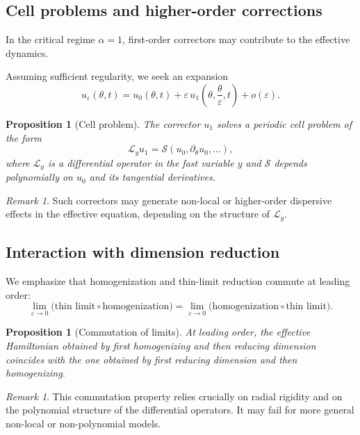 \documentclass[11pt]{amsart}
\theoremstyle{plain}
\newtheorem{proposition}[theorem]{Proposition}
\theoremstyle{definition}
\theoremstyle{remark}
\newtheorem{remark}[theorem]{Remark}
\theoremstyle{remark}
\begin{document}
\subsection{Cell problems and higher-order corrections}

In the critical regime $\alpha=1$, first-order correctors may contribute to the
effective dynamics.

Assuming sufficient regularity, we seek an expansion
\[
u_\varepsilon(\theta,t)
=
u_0(\theta,t)
+
\varepsilon\,u_1\!\left(\theta,\frac{\theta}{\varepsilon},t\right)
+ o(\varepsilon).
\]

\begin{proposition}[Cell problem]
\label{prop:cell-problem}
The corrector $u_1$ solves a periodic cell problem of the form
\[
\mathcal L_y u_1
=
\mathcal S(u_0,\partial_\theta u_0,\ldots),
\]
where $\mathcal L_y$ is a differential operator in the fast variable $y$ and
$\mathcal S$ depends polynomially on $u_0$ and its tangential derivatives.
\end{proposition}

\begin{remark}
Such correctors may generate non-local or higher-order dispersive effects in the
effective equation, depending on the structure of $\mathcal L_y$.
\end{remark}

\subsection{Interaction with dimension reduction}

We emphasize that homogenization and thin-limit reduction commute at leading
order:
\[
\lim_{\varepsilon\to0}
\bigl(\text{thin limit} \circ \text{homogenization}\bigr)
=
\lim_{\varepsilon\to0}
\bigl(\text{homogenization} \circ \text{thin limit}\bigr).
\]

\begin{proposition}[Commutation of limits]
At leading order, the effective Hamiltonian obtained by first homogenizing and
then reducing dimension coincides with the one obtained by first reducing
dimension and then homogenizing.
\end{proposition}

\begin{remark}
This commutation property relies crucially on radial rigidity and on the
polynomial structure of the differential operators.
It may fail for more general non-local or non-polynomial models.
\end{remark}
\end{document}
